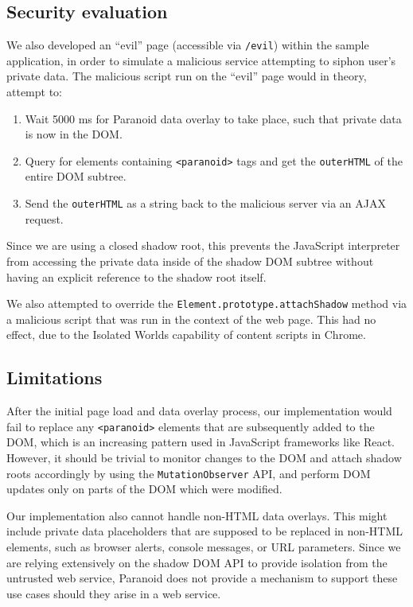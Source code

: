 \documentclass[letterpaper,twocolumn,10pt]{article}
\begin{document}
\subsection{Security evaluation}

We also developed an ``evil'' page (accessible via \texttt{/evil}) within the sample application, in order to simulate a malicious service attempting to siphon user's private data. The malicious script run on the ``evil'' page would in theory, attempt to:

\begin{enumerate}
    \item Wait 5000 ms for Paranoid data overlay to take place, such that private data is now in the DOM.
    \item Query for elements containing \texttt{<paranoid>} tags and get the \texttt{outerHTML} of the entire DOM subtree.
    \item Send the \texttt{outerHTML} as a string back to the malicious server via an AJAX request.
\end{enumerate}

Since we are using a closed shadow root, this prevents the JavaScript interpreter from accessing the private data inside of the shadow DOM subtree without having an explicit reference to the shadow root itself.

We also attempted to override the \texttt{Element.prototype.attachShadow} method via a malicious script that was run in the context of the web page. This had no effect, due to the Isolated Worlds capability of content scripts in Chrome.

\subsection{Limitations}

After the initial page load and data overlay process, our implementation would fail to replace any \texttt{<paranoid>} elements that are subsequently added to the DOM, which is an increasing pattern used in JavaScript frameworks like React. However, it should be trivial to monitor changes to the DOM and attach shadow roots accordingly by using the \texttt{MutationObserver} API, and perform DOM updates only on parts of the DOM which were modified.

Our implementation also cannot handle non-HTML data overlays. This might include private data placeholders that are supposed to be replaced in non-HTML elements, such as browser alerts, console messages, or URL parameters. Since we are relying extensively on the shadow DOM API to provide isolation from the untrusted web service, Paranoid does not provide a mechanism to support these use cases should they arise in a web service.
\end{document}
